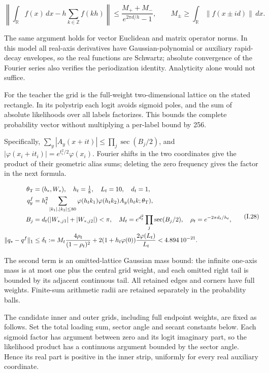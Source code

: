 \documentclass{article}
\begin{document}
\[
\left\|\int_{\mathbb R}f(x)\,dx-h\sum_{k\in\mathbb Z}f(kh)\right\|
\le\frac{M_++M_-}{e^{2\pi d/h}-1},\qquad
M_\pm\ge\int_{\mathbb R}\|f(x\pm id)\|\,dx.
\tag{I.27}
\]

The same argument holds for vector Euclidean and matrix operator norms.
In this model all real-axis derivatives have Gaussian-polynomial or
auxiliary rapid-decay envelopes, so the real functions are Schwartz;
absolute convergence of the Fourier series also verifies the
periodization identity. Analyticity alone would not suffice.

For the teacher the grid is the full-weight two-dimensional lattice on
the stated rectangle. In its polystrip each logit avoids sigmoid poles,
and the sum of absolute likelihoods over all labels factorizes. This
bounds the complete probability vector without multiplying a per-label
bound by 256.

Specifically, \(\sum_y|A_y(x+it)|\le\prod_j\sec(B_j/2)\), and
\(|\varphi(x_i+it_i)|=e^{t_i^2/2}\varphi(x_i)\). Fourier shifts in the
two coordinates give the product of their geometric alias sums; deleting
the zero frequency gives the factor in the next formula.

\[
\begin{aligned}
\theta_{\rm T}&=(b_*,W_*),\quad h_t=\tfrac18,\quad L_t=10,\quad d_t=1,\\
q_y^f&=h_t^2\sum_{|k_1|,|k_2|\le80}\varphi(h_tk_1)\varphi(h_tk_2)A_y(h_tk;\theta_{\rm T}),\\
B_j&=d_t(|W_{*,j1}|+|W_{*,j2}|)<\pi,\quad
M_t=e^{d_t^2}\prod_j\sec(B_j/2),\quad \rho_t=e^{-2\pi d_t/h_t},\\
\|q_*-q^f\|_1&\le\delta_t:=M_t\frac{4\rho_t}{(1-\rho_t)^2}
+2(1+h_t\varphi(0))\frac{2\varphi(L_t)}{L_t}<4.894\,10^{-21}.
\end{aligned}
\tag{I.28}
\]

The second term is an omitted-lattice Gaussian mass bound: the infinite
one-axis mass is at most one plus the central grid weight, and each
omitted right tail is bounded by its adjacent continuous tail. All
retained edges and corners have full weights. Finite-sum arithmetic
radii are retained separately in the probability balls.

The candidate inner and outer grids, including full endpoint weights,
are fixed as follows. Set the total loading sum, sector angle and secant
constants below. Each sigmoid factor has argument between zero and its
logit imaginary part, so the likelihood product has a continuous
argument bounded by the sector angle. Hence its real part is positive in
the inner strip, uniformly for every real auxiliary coordinate.
\end{document}
